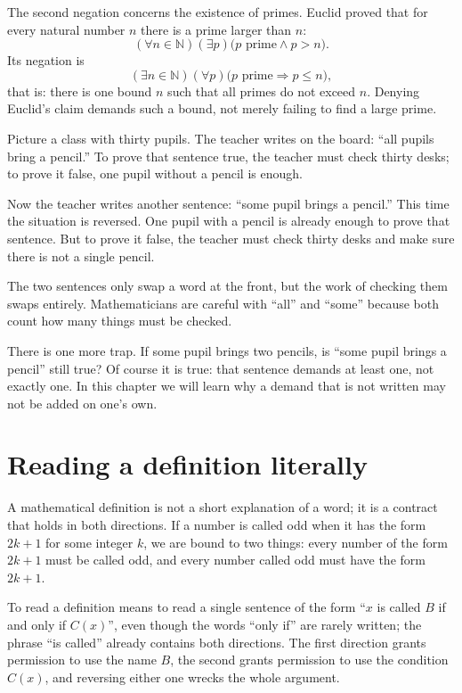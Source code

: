 The second negation concerns the existence of primes. Euclid proved that for
every natural number $n$ there is a prime larger than $n$:
\[
  (\forall n \in \mathbb{N})(\exists p)\bigl(p \text{ prime} \wedge p > n\bigr).
\]
Its negation is
\[
  (\exists n \in \mathbb{N})(\forall p)\bigl(p \text{ prime} \Rightarrow p \leq n\bigr),
\]
that is: there is one bound $n$ such that all primes do not exceed $n$. Denying
Euclid's claim demands such a bound, not merely failing to find a large prime.

\begin{untukanak}
Picture a class with thirty pupils. The teacher writes on the board: ``all pupils
bring a pencil.'' To prove that sentence true, the teacher must check thirty desks; to
prove it false, one pupil without a pencil is enough.

Now the teacher writes another sentence: ``some pupil brings a pencil.'' This time
the situation is reversed. One pupil with a pencil is already enough to prove
that sentence. But to prove it false, the teacher must check thirty desks
and make sure there is not a single pencil.

The two sentences only swap a word at the front, but the work of checking them swaps
entirely. Mathematicians are careful with ``all'' and ``some'' because both
count how many things must be checked.

There is one more trap. If some pupil brings two pencils, is ``some pupil brings
a pencil'' still true? Of course it is true: that sentence demands at least one,
not exactly one. In this chapter we will learn why a demand that is not written may not
be added on one's own.
\end{untukanak}

\section{Reading a definition literally}

A mathematical definition is not a short explanation of a word; it is a contract that
holds in both directions. If a number is called odd when it has the form $2k+1$ for
some integer $k$, we are bound to two things: every number of the form $2k+1$
must be called odd, and every number called odd must have the form $2k+1$.

To read a definition means to read a single sentence of the form ``$x$ is called $B$ if and only
if $C(x)$'', even though the words ``only if'' are rarely written; the phrase ``is called'' already
contains both directions. The first direction grants permission to use the name $B$, the second grants permission
to use the condition $C(x)$, and reversing either one wrecks the whole argument.

